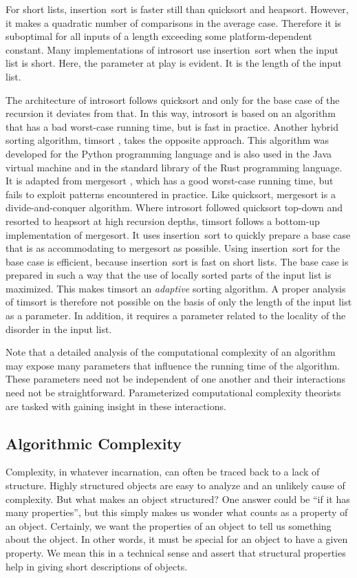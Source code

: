 \begin{example}
  For short lists, insertion~sort \parencite{cormen2009introduction} is faster still than quicksort and heapsort.
  However, it makes a quadratic number of comparisons in the average case.
  Therefore it is suboptimal for all inputs of a length exceeding some platform-dependent constant.
  Many implementations of introsort use insertion~sort when the input list is short.
  Here, the parameter at play is evident.
  It is the length of the input list.

  The architecture of introsort follows quicksort and only for the base case of the recursion it deviates from that.
  In this way, introsort is based on an algorithm that has a bad worst-case running time, but is  fast in practice.
  Another hybrid sorting algorithm, timsort \parencite{peters:timsort}, takes the opposite approach.
  This algorithm was developed for the Python programming language and is also used in the Java virtual machine and in the standard library of the Rust programming language.
  It is adapted from mergesort \parencite{cormen2009introduction}, which has a good worst-case running time, but fails to exploit patterns encountered in practice.
  Like quicksort, mergesort is a divide-and-conquer algorithm.
  Where introsort followed quicksort top-down and resorted to heapsort at high recursion depths, timsort follows a bottom-up implementation of mergesort.
  It uses insertion~sort to quickly prepare a base case that is as accommodating to mergesort as possible.
  Using insertion~sort for the base case is efficient, because insertion~sort is fast on short lists.
  The base case is prepared in such a way that the use of locally sorted parts of the input list is maximized.
  This makes timsort an \emph{adaptive} sorting algorithm.
  A proper analysis of timsort is therefore not possible on the basis of only the length of the input list as a parameter.
  In addition, it requires a parameter related to the locality of the disorder in the input list.
\end{example}

Note that a detailed analysis of the computational complexity of an algorithm may expose many parameters that influence the running time of the algorithm.
These parameters need not be independent of one another and their interactions need not be straightforward.
Parameterized computational complexity theorists are tasked with gaining insight in these interactions.

\subsection{Algorithmic Complexity}
Complexity, in whatever incarnation, can often be traced back to a lack of structure.
Highly structured objects are easy to analyze and an unlikely cause of complexity.
But what makes an object structured?
One answer could be \enquote{if it has many properties}, but this simply makes us wonder what counts as a property of an object.
Certainly, we want the properties of an object to tell us something about the object.
In other words, it must be special for an object to have a given property.
We mean this in a technical sense and assert that structural properties help in giving short descriptions of objects.

